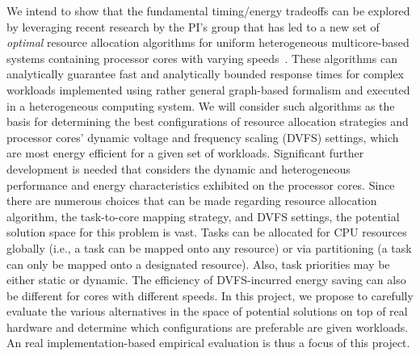
We intend to show that the fundamental timing/energy tradeoffs can be explored by leveraging recent research by the PI's group that has led to a new set of \textit{optimal} resource allocation algorithms for uniform heterogeneous multicore-based systems containing processor cores with varying speeds~\cite{Zhou2014a, Liu1, Liu2, Liu6, Liu7}. These algorithms can analytically guarantee fast and analytically bounded response times for complex workloads implemented using rather general graph-based formalism and executed in a heterogeneous computing system.  %
We will consider such algorithms as the basis for determining the best configurations of resource allocation  strategies and processor cores' dynamic voltage and frequency scaling (DVFS) settings, which are most energy efficient for a given set of workloads. Significant further development is needed that considers the dynamic and heterogeneous performance and energy characteristics exhibited on the processor cores.
 Since there are numerous choices that can be made regarding resource allocation algorithm,  the task-to-core mapping strategy, and DVFS settings, the potential solution space for this problem is vast. Tasks can be allocated for CPU resources globally (i.e., a task can be mapped onto any resource) or via partitioning (a task can only be mapped onto a designated resource). Also, task priorities may be either static or dynamic. %
 The efficiency of DVFS-incurred energy saving can also be different for cores with different speeds. 
 In this project, we propose to carefully evaluate the various alternatives in the space of potential solutions on top of real hardware and determine which configurations are preferable are given workloads. An real implementation-based empirical evaluation is thus a focus of this project.


